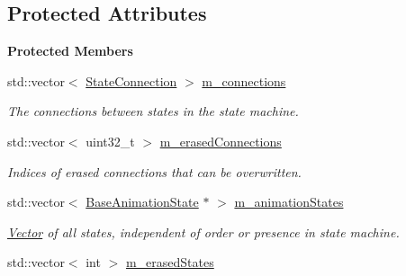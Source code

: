 \subsection*{Protected Attributes}
\begin{Indent}\textbf{ Protected Members}\par
\begin{DoxyCompactItemize}
\item 
\mbox{\label{classrev_1_1_animation_state_machine_a2f3d3518879f246998a91a6ce9b96820}} 
std\+::vector$<$ \mbox{\hyperlink{classrev_1_1_state_connection}{State\+Connection}} $>$ \mbox{\hyperlink{classrev_1_1_animation_state_machine_a2f3d3518879f246998a91a6ce9b96820}{m\+\_\+connections}}
\begin{DoxyCompactList}\small\item\em The connections between states in the state machine. \end{DoxyCompactList}\item 
\mbox{\label{classrev_1_1_animation_state_machine_a3857f553b9c59b58019816c60acc0be3}} 
std\+::vector$<$ uint32\+\_\+t $>$ \mbox{\hyperlink{classrev_1_1_animation_state_machine_a3857f553b9c59b58019816c60acc0be3}{m\+\_\+erased\+Connections}}
\begin{DoxyCompactList}\small\item\em Indices of erased connections that can be overwritten. \end{DoxyCompactList}\item 
\mbox{\label{classrev_1_1_animation_state_machine_a36be3b136bd66c467e04c1c9e079690f}} 
std\+::vector$<$ \mbox{\hyperlink{classrev_1_1_base_animation_state}{Base\+Animation\+State}} $\ast$ $>$ \mbox{\hyperlink{classrev_1_1_animation_state_machine_a36be3b136bd66c467e04c1c9e079690f}{m\+\_\+animation\+States}}
\begin{DoxyCompactList}\small\item\em \mbox{\hyperlink{classrev_1_1_vector}{Vector}} of all states, independent of order or presence in state machine. \end{DoxyCompactList}\item 
\mbox{\label{classrev_1_1_animation_state_machine_aa64b4dae2b2c58d6ec3952126249d478}} 
std\+::vector$<$ int $>$ \mbox{\hyperlink{classrev_1_1_animation_state_machine_aa64b4dae2b2c58d6ec3952126249d478}{m\+\_\+erased\+States}}

\end{DoxyCompactItemize}
\end{Indent}

